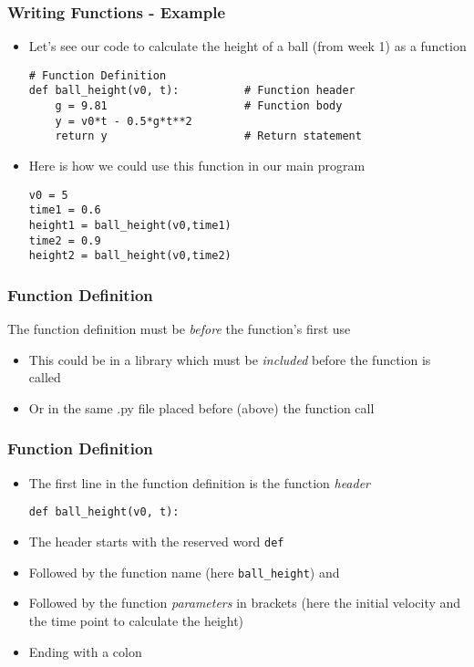 \documentclass[english,14pt]{beamer}
\begin{document}
\begin{frame}[fragile]
\frametitle{Writing Functions - Example}
    \begin{itemize}
        \item Let's see our code to calculate the height of a ball (from week 1) as a function
\begin{lstlisting}[style=CStyle]
# Function Definition
def ball_height(v0, t):          # Function header
    g = 9.81                     # Function body
    y = v0*t - 0.5*g*t**2
    return y                     # Return statement
\end{lstlisting}
         \item Here is how we could use this function in our main program
\begin{lstlisting}[style=CStyle]
v0 = 5
time1 = 0.6
height1 = ball_height(v0,time1)
time2 = 0.9
height2 = ball_height(v0,time2)
\end{lstlisting}

    \end{itemize}
\end{frame}


\begin{frame}[fragile]
\frametitle{Function Definition}
 The function definition must be \textit{before} the function's first use
 \begin{itemize}
        \item This could be in a library which must be \textit{included} before the function is called
		\item Or in the same .py file placed before (above) the function call 
	\end{itemize}
\end{frame}

\begin{frame}[fragile]
\frametitle{Function Definition}
 \begin{itemize}
		\item The first line in the function definition is the function \textit{header}
\begin{lstlisting}[style=CStyle]
 def ball_height(v0, t): 
\end{lstlisting}
		\item The header starts with the reserved word \texttt{def} 
		\item Followed by the function name (here \texttt{ball\_height}) and 
		\item Followed by the function \textit{parameters} in brackets (here the initial velocity and the time point to calculate the height) 
		\item Ending with a colon
	\end{itemize}
\end{frame}
\end{document}

